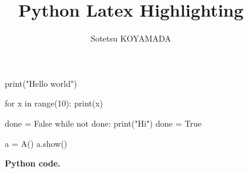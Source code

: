 \documentclass{article}
\title{Python Latex Highlighting}
\author{Sotetsu KOYAMADA}
\begin{document}
\maketitle

\begin{figure}[htbp]
\centering
\begin{python}
print("Hello world")

for x in range(10):
    print(x)

    done = False
while not done:
    print("Hi")
    done = True

a = A()
a.show()
\end{python}
\caption{\textbf{Python code.}}
\end{figure}
\end{document}
